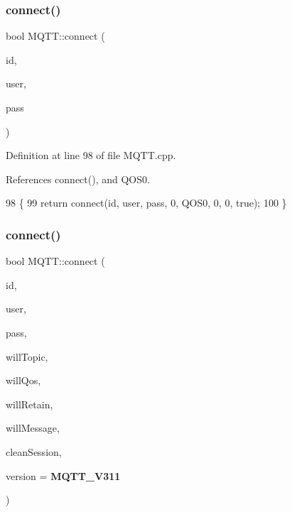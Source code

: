 \subsubsection{connect()\hspace{0.1cm}{\footnotesize\ttfamily [2/3]}}
{\footnotesize\ttfamily bool M\+Q\+T\+T\+::connect (\begin{DoxyParamCaption}\item[{const char $\ast$}]{id,  }\item[{const char $\ast$}]{user,  }\item[{const char $\ast$}]{pass }\end{DoxyParamCaption})}



Definition at line 98 of file M\+Q\+T\+T.\+cpp.



References connect(), and Q\+O\+S0.


\begin{DoxyCode}
98                                                                      \{
99     \textcolor{keywordflow}{return} connect(\textcolor{keywordtype}{id}, user, pass, 0, QOS0, 0, 0, \textcolor{keyword}{true});
100 \}
\end{DoxyCode}
\mbox{\label{class_m_q_t_t_aa880316318b5bdc133c2f8c6bba1e253}} 
\subsubsection{connect()\hspace{0.1cm}{\footnotesize\ttfamily [3/3]}}
{\footnotesize\ttfamily bool M\+Q\+T\+T\+::connect (\begin{DoxyParamCaption}\item[{const char $\ast$}]{id,  }\item[{const char $\ast$}]{user,  }\item[{const char $\ast$}]{pass,  }\item[{const char $\ast$}]{will\+Topic,  }\item[{\textbf{ E\+M\+Q\+T\+T\+\_\+\+Q\+OS}}]{will\+Qos,  }\item[{uint8\+\_\+t}]{will\+Retain,  }\item[{const char $\ast$}]{will\+Message,  }\item[{bool}]{clean\+Session,  }\item[{\textbf{ M\+Q\+T\+T\+\_\+\+V\+E\+R\+S\+I\+ON}}]{version = {\ttfamily \textbf{ M\+Q\+T\+T\+\_\+\+V311}} }\end{DoxyParamCaption})}



